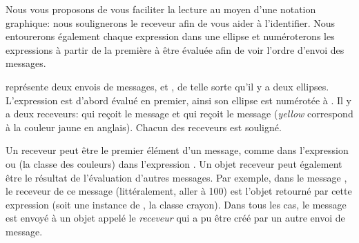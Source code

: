 \documentclass[a4paper,10pt,twoside]{book}
\begin{document}


Nous vous proposons de vous faciliter la lecture au moyen d'une
notation graphique: nous soulignerons le receveur afin de vous aider
\`a l'identifier. Nous entourerons \'egalement chaque expression dans
une ellipse et num\'eroterons les expressions \`a partir de la
premi\`ere \`a \^etre \'evalu\'ee afin de voir l'ordre d'envoi des messages.


 repr\'esente deux envois de messages,  et , de telle sorte qu'il y a
deux ellipses. L'expression  est d'abord \'evalu\'e
en premier, ainsi son ellipse est num\'erot\'ee \`a . Il y a
deux receveurs:  qui re\c{c}oit le message 
et  qui re\c{c}oit le message  
(\emph{yellow} correspond \`a la couleur jaune en anglais). 
Chacun des receveurs est soulign\'e.

Un receveur peut \^etre le premier \'el\'ement d'un message, comme
 dans l'expression  ou  
(la classe des couleurs)
dans l'expression . Un objet receveur peut
\'egalement \^etre le r\'esultat de l'\'evaluation d'autres
messages. Par exemple, dans le message , le
receveur de ce message  
(litt\'eralement, aller \`a 100)
est l'objet retourn\'e par cette expression  
(soit une instance de , la classe crayon). Dans tous les cas,
le message est envoy\'e \`a un objet appel\'e le \emph{receveur} qui a
pu \^etre cr\'e\'e par un autre envoi de message.
\end{document}
